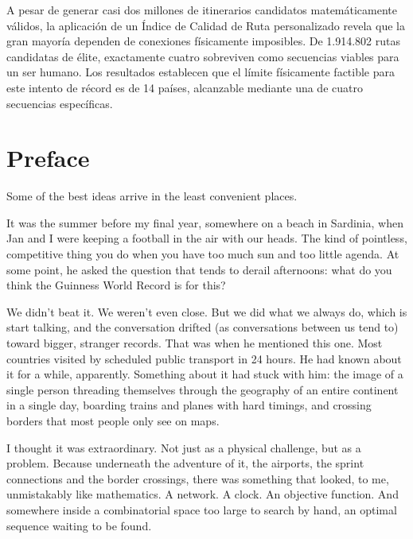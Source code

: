\documentclass[11pt, a4paper,twoside,openany]{tfg_dtic_upf}
\let\cleardoublepage\clearpage
\numberwithin{equation}{section}
\begin{document}
A pesar de generar casi dos millones de itinerarios candidatos matemáticamente válidos, la aplicación de un Índice de Calidad de Ruta personalizado revela que la gran mayoría dependen de conexiones físicamente imposibles. De 1.914.802 rutas candidatas de élite, exactamente cuatro sobreviven como secuencias viables para un ser humano. Los resultados establecen que el límite físicamente factible para este intento de récord es de 14 países, alcanzable mediante una de cuatro secuencias específicas.


\cleardoublepage

\section*{\Large \sffamily Preface}

Some of the best ideas arrive in the least convenient places.

\medskip

It was the summer before my final year, somewhere on a beach in Sardinia, when Jan and I were keeping a football in the air with our heads. The kind of pointless, competitive thing you do when you have too much sun and too little agenda. At some point, he asked the question that tends to derail afternoons: what do you think the Guinness World Record is for this?

\medskip

We didn't beat it. We weren't even close. But we did what we always do, which is start talking, and the conversation drifted (as conversations between us tend to) toward bigger, stranger records. That was when he mentioned this one. Most countries visited by scheduled public transport in 24 hours. He had known about it for a while, apparently. Something about it had stuck with him: the image of a single person threading themselves through the geography of an entire continent in a single day, boarding trains and planes with hard timings, and crossing borders that most people only see on maps.

\medskip

I thought it was extraordinary. Not just as a physical challenge, but as a problem. Because underneath the adventure of it, the airports, the sprint connections and the border crossings, there was something that looked, to me, unmistakably like mathematics. A network. A clock. An objective function. And somewhere inside a combinatorial space too large to search by hand, an optimal sequence waiting to be found.
\end{document}
